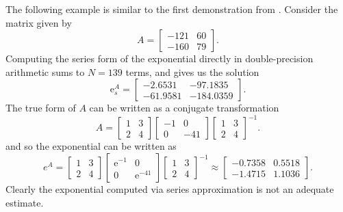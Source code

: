 The following example is similar to the first demonstration from \cite{moler2003dubious}.
Consider the matrix given by
\begin{equation*}
    A = \begin{bmatrix}
        -121 & 60 \\
        -160 & 79
    \end{bmatrix}.
\end{equation*}
Computing the series form of the exponential directly in double-precision arithmetic sums to $N = 139$ terms, and gives us the solution
\begin{equation*}
    \mathrm{e}_s^A = \begin{bmatrix}
        -2.6531 & -97.1835 \\
        -61.9581 & -184.0359
    \end{bmatrix}.
\end{equation*}
The true form of $A$ can be written as a conjugate transformation
\begin{equation*}
    A = \begin{bmatrix}
        1 & 3 \\
        2 & 4
    \end{bmatrix} \begin{bmatrix}
        -1 & 0 \\
        0 & -41
    \end{bmatrix} \begin{bmatrix}
        1 & 3 \\
        2 & 4
    \end{bmatrix}^{-1}.
\end{equation*}
and so the exponential can be written as 
\begin{equation*}
    e^A = \begin{bmatrix}
        1 & 3 \\
        2 & 4
    \end{bmatrix} \begin{bmatrix}
        \mathrm{e}^{-1} & 0 \\
        0 & \mathrm{e}^{-41}
    \end{bmatrix} \begin{bmatrix}
        1 & 3 \\
        2 & 4
    \end{bmatrix}^{-1} \approx \begin{bmatrix}
        -0.7358 & 0.5518 \\
        -1.4715 & 1.1036
    \end{bmatrix}.
\end{equation*}
Clearly the exponential computed via series approximation is not an adequate estimate.


